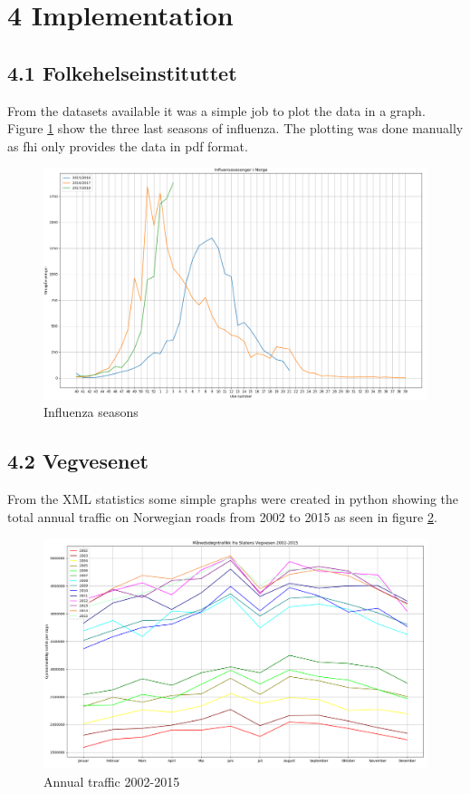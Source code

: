 \documentclass[11pt]{report}
\begin{document}
\chapter*{\vspace{-3cm}4 Implementation}

\section*{4.1 Folkehelseinstituttet}
From the datasets available it was a simple job to plot the data in a graph. Figure \ref{fig:infstat} show the three last seasons of influenza. The plotting was done manually as fhi only provides the data in pdf format.

\begin{figure}[ht]
\includegraphics[width=16cm]{influenza_15_till_18}
\centering
\caption{Influenza seasons}
\label{fig:infstat}
\end{figure}

\newpage

\section*{4.2 Vegvesenet}
From the XML statistics some simple graphs were created in python showing the total annual traffic on Norwegian roads from 2002 to 2015 as seen in figure \ref{fig:anualtotal}. 

\begin{figure}[ht]
\includegraphics[width=16cm]{xml_02_15_annual_total}
\centering
\caption{Annual traffic 2002-2015}
\label{fig:anualtotal}
\end{figure}
\end{document}
